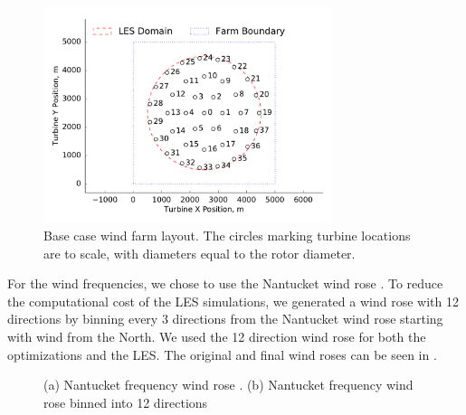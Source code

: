 \documentclass[conf]{new-aiaa}
\begin{document}
\begin{figure}[ht]
	\centering
	\includegraphics[width=0.75\textwidth]{final_images/round_farm_38Turbines_5DSpacing_start.pdf}
	\caption{Base case wind farm layout. The circles marking turbine locations are to scale, with diameters equal to the rotor diameter.}
	\label{fig:starting-layout}
\end{figure}

For the wind frequencies, we chose to use the Nantucket wind rose \cite{wrcc2017} %
. To reduce the computational cost of the LES simulations, we generated a wind rose with 12 directions by binning every 3 directions from the Nantucket wind rose starting with wind from the North. We used the 12 direction wind rose for both the optimizations and the LES. The original and final wind roses can be seen in .

\begin{figure}[ht]
	\centering
	\caption{(a) Nantucket frequency wind rose \cite{wrcc2017}. (b) Nantucket frequency wind rose binned into 12 directions}
	\label{fig:windrose}
\end{figure}
\end{document}
